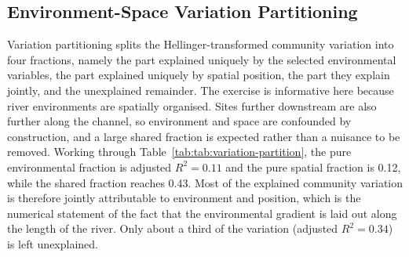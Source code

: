 \documentclass[11pt]{article}
\begin{document}
\subsection{Environment-Space Variation Partitioning}
Variation partitioning splits the Hellinger-transformed community variation into four fractions, namely the part explained uniquely by the selected environmental variables, the part explained uniquely by spatial position, the part they explain jointly, and the unexplained remainder. The exercise is informative here because river environments are spatially organised. Sites further downstream are also further along the channel, so environment and space are confounded by construction, and a large shared fraction is expected rather than a nuisance to be removed. Working through Table~\ref{tab:tab:variation-partition}, the pure environmental fraction is adjusted $R^2 = 0.11$ and the pure spatial fraction is 0.12, while the shared fraction reaches 0.43. Most of the explained community variation is therefore jointly attributable to environment and position, which is the numerical statement of the fact that the environmental gradient is laid out along the length of the river. Only about a third of the variation (adjusted $R^2 = 0.34$) is left unexplained.
\begin{table}[!h]
\centering
\caption{\label{tab:tab:variation-partition}Variation partitioning between selected environmental predictors and polynomial spatial coordinates.}
\centering
{}
\end{table}
\end{document}
